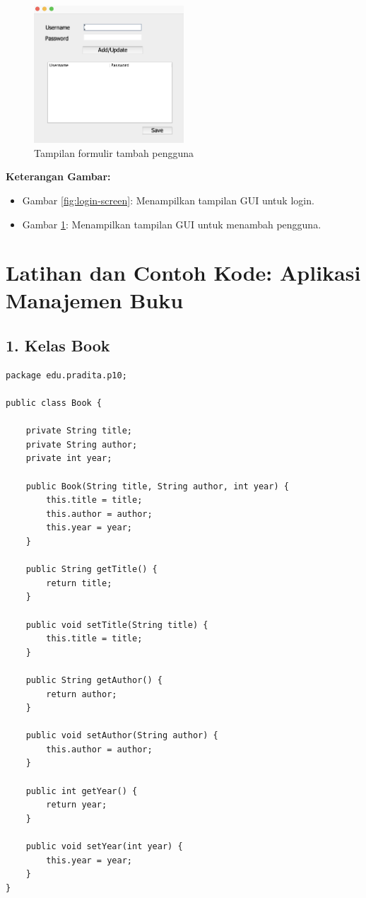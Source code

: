 \begin{figure}[h!]
\centering
\includegraphics[width=0.5\textwidth]{assets/add-user-form.png}
\caption{Tampilan formulir tambah pengguna}
\label{fig:add-user-form}
\end{figure}

\textbf{Keterangan Gambar:} 
\begin{itemize}
\item Gambar \ref{fig:login-screen}: Menampilkan tampilan GUI untuk login.
\item Gambar \ref{fig:add-user-form}: Menampilkan tampilan GUI untuk menambah pengguna.
\end{itemize}



\section{Latihan dan Contoh Kode: Aplikasi Manajemen Buku}

\subsection{1. Kelas Book}

\begin{lstlisting}[style=JavaStyle]
package edu.pradita.p10;

public class Book {
	
	private String title;
	private String author;
	private int year;
	
	public Book(String title, String author, int year) {
		this.title = title;
		this.author = author;
		this.year = year;
	}
	
	public String getTitle() {
		return title;
	}
	
	public void setTitle(String title) {
		this.title = title;
	}
	
	public String getAuthor() {
		return author;
	}
	
	public void setAuthor(String author) {
		this.author = author;
	}
	
	public int getYear() {
		return year;
	}
	
	public void setYear(int year) {
		this.year = year;
	}
}
\end{lstlisting}


